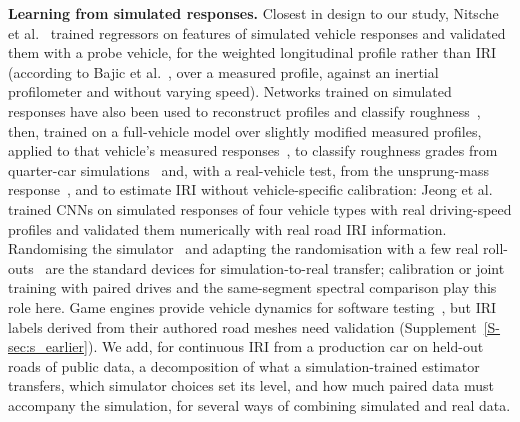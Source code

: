 \textbf{Learning from simulated responses.}
Closest in design to our study, Nitsche et al.~\cite{nitsche2014wlp} trained regressors on features of simulated vehicle responses and validated them with a probe vehicle, for the weighted longitudinal profile rather than IRI (according to Bajic et al.~\cite{bajic2021ml}, over a measured profile, against an inertial profilometer and without varying speed).
Networks trained on simulated responses have also been used to reconstruct profiles and classify roughness~\cite{ngwangwa2010ann}, then, trained on a full-vehicle model over slightly modified measured profiles, applied to that vehicle's measured responses~\cite{ngwangwa2014exp}, to classify roughness grades from quarter-car simulations~\cite{rcnn2023sim} and, with a real-vehicle test, from the unsprung-mass response~\cite{speedadaptive2025}, and to estimate IRI without vehicle-specific calibration: Jeong et al.~\cite{jeong2020cnn} trained CNNs on simulated responses of four vehicle types with real driving-speed profiles and validated them numerically with real road IRI information.
Randomising the simulator~\cite{tobin2017dr,peng2018dr} and adapting the randomisation with a few real roll-outs~\cite{chebotar2019simopt} are the standard devices for simulation-to-real transfer; calibration or joint training with paired drives and the same-segment spectral comparison play this role here.
Game engines provide vehicle dynamics for software testing~\cite{gambi2019beamng,beamng}, but IRI labels derived from their authored road meshes need validation (Supplement~\ref{S-sec:s_earlier}).
We add, for continuous IRI from a production car on held-out roads of public data, a decomposition of what a simulation-trained estimator transfers, which simulator choices set its level, and how much paired data must accompany the simulation, for several ways of combining simulated and real data.
